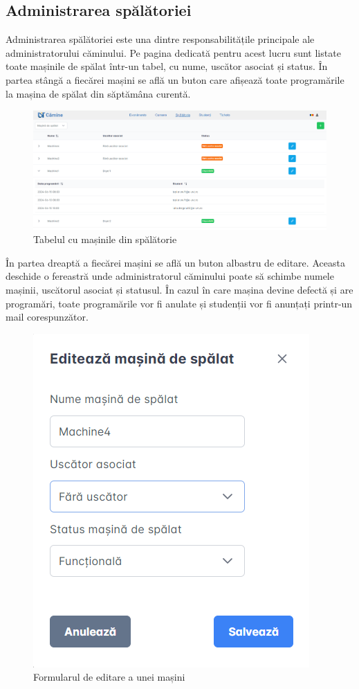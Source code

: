 \documentclass[12pt,a4paper]{report}
\theoremstyle{definition}
\theoremstyle{remark}
\begin{document}
\subsection{Administrarea spălătoriei}

\par Administrarea spălătoriei este una dintre responsabilitățile principale ale administratorului căminului. Pe pagina dedicată pentru acest lucru sunt listate toate mașinile de spălat într-un tabel, cu nume, uscător asociat și status. În partea stângă a fiecărei mașini se află un buton care afișează toate programările la mașina de spălat din săptămâna curentă. 


\begin{figure}[H]
    \centering
    \includegraphics[width=0.8\linewidth]{resurse/ghid_utilizare/administrare_spalatorie.png}
    \caption{Tabelul cu mașinile din spălătorie}
\end{figure}

\par În partea dreaptă a fiecărei mașini se află un buton albastru de editare. Aceasta deschide o fereastră unde administratorul căminului poate să schimbe numele mașinii, uscătorul asociat și statusul. În cazul în care mașina devine defectă și are programări, toate programările vor fi anulate și studenții vor fi anunțați printr-un mail corespunzător.


\begin{figure}[H]
    \centering
    \includegraphics[width=0.4\linewidth]{resurse/ghid_utilizare/editare_masina.png}
    \caption{Formularul de editare a unei mașini}
\end{figure}
\end{document}
